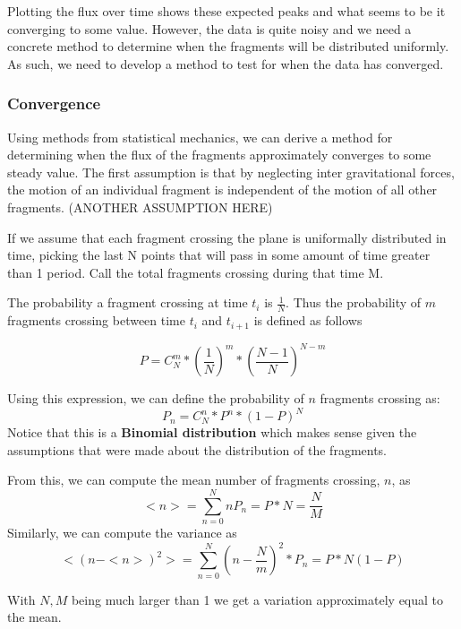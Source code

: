 \documentclass[a4paper, 12pt]{article}
\newcommand{\boldindex}[1]{%
	\textbf{#1}\index{#1}%
}
\begin{document}
Plotting the flux over time shows these expected peaks and what seems to be it converging to some value. However, the data is quite noisy and we need a concrete method to determine when the fragments will be distributed uniformly. As such, we need to develop a method to test for when the data has converged.

 \subsubsection{Convergence}
 
 Using methods from statistical mechanics, we can derive a method for determining when the flux of the fragments approximately converges to some steady value.
 The first assumption is that by neglecting inter gravitational forces, the motion of an individual fragment is independent of the motion of all other fragments.  (ANOTHER ASSUMPTION HERE)
 
 If we assume that each fragment crossing the plane is uniformally distributed in time, picking the last N points that will pass in some amount of time greater than 1 period. Call the total fragments crossing during that time M.
 
 The probability a fragment crossing at time $t_i$ is $\frac{1}{N}$. Thus the probability of $m$ fragments crossing between time $t_i$ and $t_{i+1}$ is defined as follows
 
 \begin{equation}
 	P = C^m_N * (\frac{1}{N})^m * (\frac{N - 1}{N})^{N-m}
 \end{equation}

\noindent Using this expression, we can define the probability of $n$ fragments crossing as:
\begin{equation}
	P_n = C^n_N * P^n * (1 - P)^N
\end{equation}
Notice that this is a \boldindex{Binomial distribution} which makes sense given the assumptions that were made about the distribution of the fragments.

From this, we can compute the mean number of fragments crossing, $n$, as
\begin{equation}
	<n> = \sum_{n=0}^{N} n P_n = P * N = \frac{N}{M}
\end{equation}
Similarly, we can compute the variance as
\begin{equation}
	<(n-<n>)^2> = \sum_{n=0}^{N}(n - \frac{N}{m})^2 * P_n = P * N (1 - P)
\end{equation}

With $N, M$ being much larger than 1 we get a variation approximately equal to the mean.
\end{document}
